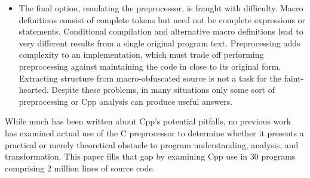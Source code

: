 \documentclass[10pt]{article}
\def\numpackages{30}
\def\numlines{2 million}
\begin{document}
\begin{itemize}
\item The final option, emulating the preprocessor, is fraught with
difficulty.  Macro definitions consist of complete tokens but need not
be complete expressions or statements.  Conditional compilation and
alternative macro definitions lead to very different results from a
single original program text.  Preprocessing adds complexity to an
implementation, which must trade off performing preprocessing against
maintaining the code in close to its original form.  Extracting
structure from macro-obfuscated source is not a task for the
faint-hearted.  Despite these problems, in many situations only some
sort of preprocessing or Cpp analysis can produce useful answers.

\end{itemize}

While much has been written about Cpp's potential pitfalls, no
previous work has examined actual use of the C preprocessor to
determine whether it presents a practical or merely theoretical
obstacle to program understanding, analysis, and transformation.  This
paper fills that gap by examining Cpp use in {\numpackages} programs
comprising {\numlines} lines of source code.
\end{document}
